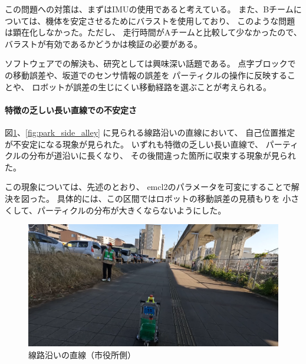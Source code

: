 \documentclass[twocolumn,9pt]{jsproceedings}
\begin{document}
この問題への対策は、まずはIMUの使用であると考えている。
また、Bチームについては、機体を安定させるためにバラストを使用しており、
このような問題は顕在化しなかった。ただし、
走行時間がAチームと比較して少なかったので、
バラストが有効であるかどうかは検証の必要がある。

ソフトウェアでの解決も、研究としては興味深い話題である。
点字ブロックでの移動誤差や、坂道でのセンサ情報の誤差を
パーティクルの操作に反映することや、
ロボットが誤差の生じにくい移動経路を選ぶことが考えられる。

\paragraph{特徴の乏しい長い直線での不安定さ}


図\ref{fig:city_hall_side_alley}、\ref{fig:park_side_alley}
に見られる線路沿いの直線において、
自己位置推定が不安定になる現象が見られた。
いずれも特徴の乏しい長い直線で、
パーティクルの分布が道沿いに長くなり、
その後間違った箇所に収束する現象が見られた。

この現象については、先述のとおり、
emcl2のパラメータを可変にすることで解決を図った。
具体的には、この区間ではロボットの移動誤差の見積もりを
小さくして、パーティクルの分布が大きくならないようにした。

\begin{figure}[h]
  \begin{center}
    \includegraphics[width=1.0\linewidth]{figs/city_hall_side_alley.pdf}
	  \caption{線路沿いの直線（市役所側）}
    \label{fig:city_hall_side_alley}
  \end{center}
\end{figure}
\end{document}
